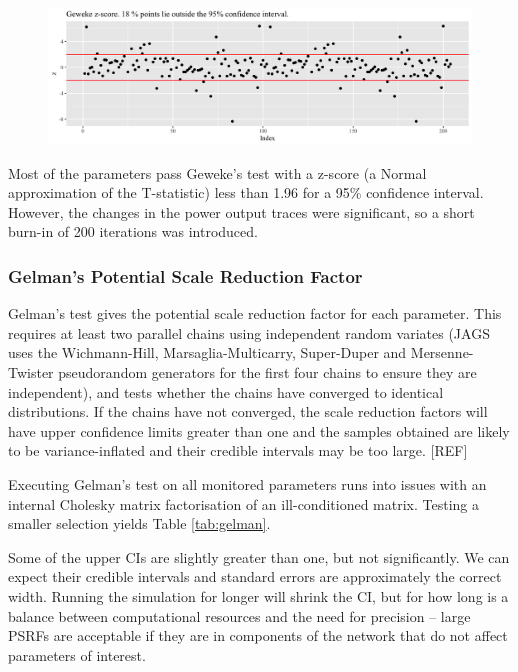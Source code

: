 \documentclass[a4paper, 12pt]{article}
\begin{document}
\begin{figure}
  \centering
  \includegraphics[width=\linewidth]{media/geweke}
  \label{fig:geweke}
\end{figure}

Most of the parameters pass Geweke's test with a z-score (a Normal approximation of the T-statistic) less than 1.96 for a 95\% confidence interval. However, the changes in the power output traces were significant, so a short burn-in of 200 iterations was introduced.

\subsubsection{Gelman's Potential Scale Reduction Factor}
Gelman's test gives the potential scale reduction factor for each parameter. This requires at least two parallel chains using independent random variates (JAGS uses the Wichmann-Hill, Marsaglia-Multicarry, Super-Duper and Mersenne-Twister pseudorandom generators for the first four chains to ensure they are independent), and tests whether the chains have converged to identical distributions. If the chains have not converged, the scale reduction factors will have upper confidence limits greater than one and the samples obtained are likely to be variance-inflated and their credible intervals may be too large. [REF]

Executing Gelman's test on all monitored parameters runs into issues with an internal Cholesky matrix factorisation of an ill-conditioned matrix. Testing a smaller selection yields Table \ref{tab:gelman}.



Some of the upper CIs are slightly greater than one, but not significantly. We can expect their credible intervals and standard errors are approximately the correct width. Running the simulation for longer will shrink the CI, but for how long is a balance between computational resources and the need for precision -- large PSRFs are acceptable if they are in components of the network that do not affect parameters of interest.
\end{document}
